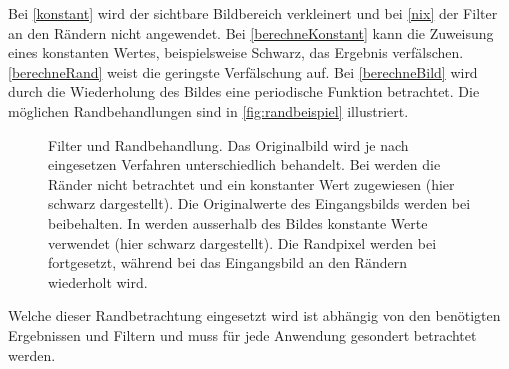 Bei \autoref{konstant} wird der sichtbare Bildbereich verkleinert und bei \autoref{nix} der Filter an den Rändern nicht
 angewendet. Bei \autoref{berechneKonstant} kann die Zuweisung eines konstanten Wertes, beispielsweise Schwarz, das
 Ergebnis verfälschen. \autoref{berechneRand} weist die geringste Verfälschung auf. Bei \autoref{berechneBild} wird
 durch die Wiederholung des Bildes eine periodische Funktion betrachtet. Die möglichen Randbehandlungen sind in
 \autoref{fig:randbeispiel} illustriert.
\begin{figure}[!ht]
	\centering
	\caption{Filter und Randbehandlung. Das Originalbild  wird je nach eingesetzen
	 Verfahren unterschiedlich behandelt. Bei  werden die Ränder nicht betrachtet und ein
	 konstanter Wert zugewiesen (hier schwarz dargestellt).	Die Originalwerte des Eingangsbilds werden bei
	  beibehalten. In  werden ausserhalb des Bildes konstante
	 Werte verwendet (hier schwarz dargestellt). Die Randpixel werden bei  fortgesetzt,
	 während bei  das Eingangsbild an den Rändern wiederholt wird.}
	\label{fig:randbeispiel}
\end{figure}
Welche dieser Randbetrachtung eingesetzt wird ist abhängig von den benötigten Ergebnissen und Filtern und muss für jede
 Anwendung gesondert betrachtet werden.

